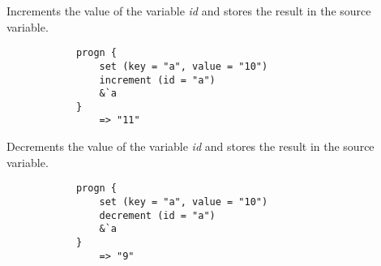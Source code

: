 \begin{multicols}{2}
\begin{verbatim}
    \end{verbatim}
    Increments the value of the variable \textit{id} and stores the result in the source variable.
    \begin{verbatim}
			progn {
			    set (key = "a", value = "10")
			    increment (id = "a")
			    &`a
			}
			    => "11"
    \end{verbatim}
    Decrements the value of the variable \textit{id} and stores the result in the source variable.
    \begin{verbatim}
			progn {
			    set (key = "a", value = "10")
			    decrement (id = "a")
			    &`a
			}
			    => "9"
    \end{verbatim}
\end{multicols}